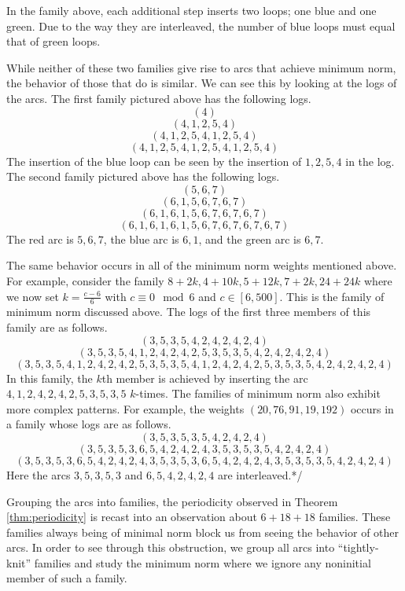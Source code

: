 In the family above, each additional step inserts two loops; one blue and one green.  Due to the way they are interleaved, the number of blue loops must equal that of green loops. 

While neither of these two families give rise to arcs that achieve minimum norm, the behavior of those that do is similar. We can see this by looking at the logs of the arcs. The first family pictured above has the following logs.
 $$(4)$$
 $$(4, 1, 2, 5, 4)$$
 $$(4, 1, 2, 5, 4, 1, 2, 5, 4)$$
 $$(4, 1, 2, 5, 4, 1, 2, 5, 4, 1, 2, 5, 4)$$
The insertion of the blue loop can be seen by the insertion of $1, 2, 5, 4$ in the log. The second family pictured above has the following logs.
 $$(5, 6, 7)$$
 $$(6, 1, 5, 6, 7, 6, 7)$$
 $$(6, 1, 6, 1, 5, 6, 7, 6, 7, 6, 7)$$
 $$(6, 1, 6, 1, 6, 1, 5, 6, 7, 6, 7, 6, 7, 6, 7)$$
The red arc is $5, 6, 7$, the blue arc is $6, 1$, and the green arc is $6, 7$.

The same behavior occurs in all of the minimum norm weights mentioned above. For example, consider the family ${8 + 2k, 4 + 10k, 5 + 12k, 7 + 2k, 24 + 24k}$ where we now set $k = \frac{c - 6}{6}$ with $c \equiv 0 \mod{6}$ and $c \in [6, 500]$. This is the family of minimum norm discussed above. The logs of the first three members of this family are as follows.
 $$(3, 5, 3, 5, 4, 2, 4, 2, 4, 2, 4)$$
 $$(3, 5, 3, 5, 4, 1, 2, 4, 2, 4, 2, 5, 3, 5, 3, 5, 4, 2, 4, 2, 4, 2, 4)$$
 $$(3, 5, 3, 5, 4, 1, 2, 4, 2, 4, 2, 5, 3, 5, 3, 5, 4, 1, 2, 4, 2, 4, 2, 5, 3, 
5, 3, 5, 4, 2, 4, 2, 4, 2, 4)$$
In this family, the $k$th member is achieved by inserting the arc $4, 1, 2, 4, 
2, 4, 2, 5, 3, 5, 3, 5$ $k$-times. The 
families of minimum norm also exhibit more complex patterns. For example, the weights $(20, 76, 91, 19, 192)$ occurs in a family whose logs are as follows.
 $$(3, 5, 3, 5, 3, 5, 4, 2, 4, 2, 4)$$
 $$(3, 5, 3, 5, 3, 6, 5, 4, 2, 4, 2, 4, 3, 5, 3, 5, 3, 5, 4, 2, 4, 2, 4)$$
 $$(3, 5, 3, 5, 3, 6, 5, 4, 2, 4, 2, 4, 3, 5, 3, 5, 3, 6, 5, 4, 2, 4, 2, 4, 3, 
5, 3, 5, 3, 5, 4, 2, 4, 2, 4)$$
Here the arcs $3, 5, 3, 5, 3$ and $6, 5, 4, 2, 4, 2, 4$ are interleaved.*/

Grouping the arcs into families, the periodicity observed in Theorem \ref{thm:periodicity} is recast into an observation about $6+18+18$ families. These families always being of minimal norm block us from seeing the behavior of other arcs. In order to see through this obstruction, we group all arcs into ``tightly-knit'' families and study the minimum norm where we ignore any noninitial member of such a family.

